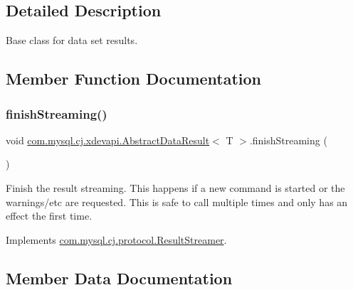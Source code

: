 \subsection{Detailed Description}
Base class for data set results. 

\subsection{Member Function Documentation}
\mbox{\label{classcom_1_1mysql_1_1cj_1_1xdevapi_1_1_abstract_data_result_a6a37bb1022bc6bea43edf1f996dca4d4}} 
\subsubsection{\texorpdfstring{finish\+Streaming()}{finishStreaming()}}
{\footnotesize\ttfamily void \mbox{\hyperlink{classcom_1_1mysql_1_1cj_1_1xdevapi_1_1_abstract_data_result}{com.\+mysql.\+cj.\+xdevapi.\+Abstract\+Data\+Result}}$<$ T $>$.finish\+Streaming (\begin{DoxyParamCaption}{ }\end{DoxyParamCaption})}

Finish the result streaming. This happens if a new command is started or the warnings/etc are requested. This is safe to call multiple times and only has an effect the first time. 

Implements \mbox{\hyperlink{interfacecom_1_1mysql_1_1cj_1_1protocol_1_1_result_streamer}{com.\+mysql.\+cj.\+protocol.\+Result\+Streamer}}.



\subsection{Member Data Documentation}
\mbox{\label{classcom_1_1mysql_1_1cj_1_1xdevapi_1_1_abstract_data_result_a77a21d804536b015015d39ad4b45a1c0}} 
